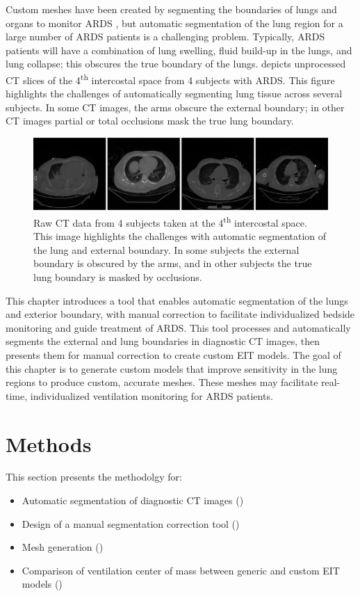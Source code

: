 Custom meshes have been created by segmenting the boundaries of lungs and organs
to monitor ARDS \parencite{yang_lung_2021}, but automatic segmentation of the lung region 
for a large number of ARDS patients is a challenging problem. Typically, ARDS patients 
will have a combination of
lung swelling, fluid build-up in the lungs, and lung collapse; this
obscures the 
true boundary of the lungs.  depicts unprocessed CT slices 
of the 4\textsuperscript{th} intercostal space from 4 subjects with
ARDS. This figure highlights the challenges  of automatically 
segmenting lung tissue across several subjects. 
In some CT images, the arms obscure the external boundary; in other 
CT images partial or total occlusions 
mask the true lung boundary.

\begin{figure}
	\centering
	\includegraphics[width=\textwidth]{chapter5-CT_to_mesh/imgs/raw_ct_imgs.png}
	\caption[Raw CT images at the 4\textsuperscript{th} intersoctal space]{\label{fig:raw-ct}%
	Raw CT data from 4 subjects  taken at the 4\textsuperscript{th} intercostal space.
	This image highlights the challenges with automatic segmentation of the lung and external boundary. 
	In some subjects the external boundary is obscured by the arms, and in other subjects the 
	true lung boundary is masked by occlusions.
	}
\end{figure}

This chapter introduces a tool that enables automatic segmentation 
of the lungs and exterior boundary, with manual correction to facilitate individualized
bedside monitoring and guide treatment of ARDS.
This tool processes and automatically segments the external and lung boundaries 
in diagnostic CT images, 
then presents them for manual correction 
to create custom EIT models. 
The goal of this chapter is to generate custom models that improve sensitivity 
in the lung regions to produce custom, accurate 
meshes. 
These meshes may facilitate real-time, individualized ventilation
monitoring for ARDS patients.  

\section{Methods}
This section presents the methodolgy for:
\begin{itemize}
	\item Automatic segmentation of diagnostic CT images ()
	\item Design of a manual segmentation correction tool ()
	\item Mesh generation ()
	\item Comparison of ventilation center of mass 
	between generic and custom EIT models ()
\end{itemize}

